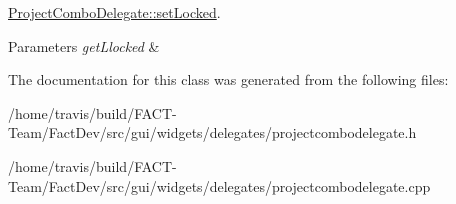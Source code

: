 \hyperlink{classGui_1_1Widgets_1_1Delegates_1_1ProjectComboDelegate_ac93369dde11856d4097851f7f1158f48}{Project\-Combo\-Delegate\-::set\-Locked}. 


\begin{DoxyParams}{Parameters}
{\em get\-Llocked} & \\
\hline
\end{DoxyParams}


The documentation for this class was generated from the following files\-:\begin{DoxyCompactItemize}
\item 
/home/travis/build/\-F\-A\-C\-T-\/\-Team/\-Fact\-Dev/src/gui/widgets/delegates/projectcombodelegate.\-h\item 
/home/travis/build/\-F\-A\-C\-T-\/\-Team/\-Fact\-Dev/src/gui/widgets/delegates/projectcombodelegate.\-cpp\end{DoxyCompactItemize}
